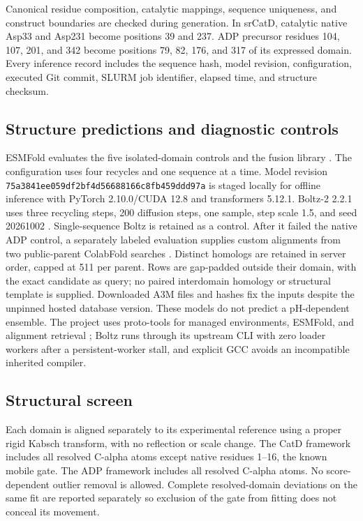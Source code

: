 \documentclass{article}
\begin{document}
Canonical residue composition, catalytic mappings, sequence uniqueness, and
construct boundaries are checked during generation. In srCatD, catalytic
native Asp33 and Asp231 become positions 39 and 237. ADP precursor residues
104, 107, 201, and 342 become positions 79, 82, 176, and 317 of its expressed
domain. Every inference record includes the sequence hash, model revision,
configuration, executed Git commit, SLURM job identifier, elapsed time, and
structure checksum.

\subsection{Structure predictions and diagnostic controls}
ESMFold evaluates the five isolated-domain controls and the fusion library
\citep{lin2023}. The configuration uses four recycles and one sequence
at a time. Model revision
\texttt{75a3841ee059df2bf4d56688166c8fb459ddd97a}
is staged locally for offline inference with PyTorch 2.10.0/CUDA 12.8 and
transformers 5.12.1. Boltz-2 2.2.1 uses three recycling steps, 200 diffusion
steps, one sample, step scale 1.5, and seed 20261002 \citep{passaro2025}.
Single-sequence Boltz is retained as a control. After it failed the native ADP
control, a separately labeled evaluation supplies custom alignments from two
public-parent ColabFold searches \citep{mirdita2022}. Distinct homologs are
retained in server order, capped at 511 per parent. Rows are gap-padded outside
their domain, with the exact candidate as query; no paired interdomain
homology or structural template is supplied. Downloaded A3M files and hashes
fix the inputs despite the unpinned hosted database version. These models do
not predict a pH-dependent ensemble. The project uses proto-tools for managed
environments, ESMFold, and alignment retrieval \citep{merchant2026}; Boltz runs
through its upstream CLI with zero loader workers after a persistent-worker
stall, and explicit GCC avoids an incompatible inherited compiler.

\subsection{Structural screen}
Each domain is aligned separately to its experimental reference using a proper
rigid Kabsch transform, with no reflection or scale change. The CatD framework
includes all resolved C-alpha atoms except native residues 1--16, the known
mobile gate. The ADP framework includes all resolved C-alpha atoms. No
score-dependent outlier removal is allowed. Complete resolved-domain deviations
on the same fit are reported separately so exclusion of the gate from fitting
does not conceal its movement.
\end{document}
